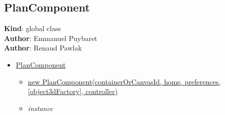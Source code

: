 \documentclass[a4paper]{report}
\providecommand{\tightlist}{%
  \setlength{\itemsep}{0pt}\setlength{\parskip}{0pt}}
\begin{document}
\hypertarget{plancomponent}{%
\subsection{PlanComponent}\label{plancomponent}}

\textbf{Kind}: global class\\
\textbf{Author}: Emmanuel Puybaret\\
\textbf{Author}: Renaud Pawlak

\begin{itemize}
\tightlist
\item
  \protect\hyperlink{PlanComponent}{PlanComponent}

  \begin{itemize}
  \tightlist
  \item
    \protect\hyperlink{new_PlanComponent_new}{new
    PlanComponent(containerOrCanvasId, home, preferences,
    {[}object3dFactory{]}, controller)}
  \item
    \emph{instance}


\end{itemize}
\end{itemize}
\end{document}
